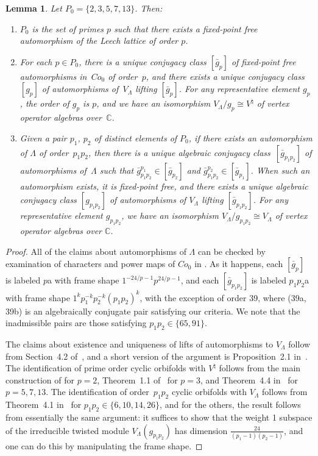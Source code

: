 \documentclass[pdftex]{sigma}
\newcommand{\bC}{\mathbb{C}}
\newtheorem{lem}[thm]{Lemma}
\theoremstyle{definition}
\begin{document}
\begin{lem} \label{lem:cyclic-leech-orbifolds} Let $P_0 = \{ 2,3,5,7,13\}$. Then:
\begin{enumerate}\itemsep=0pt
\item[$1.$] $P_0$ is the set of primes $p$ such that there exists a fixed-point free automorphism of the Leech lattice of order $p$.
\item[$2.$] For each $p \in P_0$, there is a unique conjugacy class $[\bar{g}_p]$ of fixed-point free automorphisms in~$Co_0$ of order~$p$, and there exists a unique conjugacy class $[g_p]$ of automorphisms of~$V_\Lambda$ lifting $[\bar{g}_p]$. For any representative element $g_p$, the order of $g_p$ is $p$, and we have an isomorphism $V_\Lambda/g_p \cong V^\natural$ of vertex operator algebras over~$\bC$.
\item[$3.$] Given a pair $p_1$, $p_2$ of distinct elements of $P_0$, if there exists an automorphism of $\Lambda$ of order~$p_1p_2$, then there is a unique algebraic conjugacy class~$[\bar{g}_{p_1p_2}]$ of automorphisms of~$\Lambda$ such that $\bar{g}_{p_1p_2}^{p_1} \in [\bar{g}_{p_2}]$ and $\bar{g}_{p_1p_2}^{p_2} \in [\bar{g}_{p_1}]$. When such an automorphism exists, it is fixed-point free, and there exists a unique algebraic conjugacy class $[g_{p_1p_2}]$ of automorphisms of $V_\Lambda$ lifting $[\bar{g}_{p_1p_2}]$. For any representative element $g_{p_1p_2}$, we have an isomorphism $V_\Lambda/g_{p_1p_2} \cong V_\Lambda$ of vertex operator algebras over $\bC$.
\end{enumerate}
\end{lem}
\begin{proof}All of the claims about automorphisms of $\Lambda$ can be checked by examination of characters and power maps of $Co_0$ in \cite{GAP}. As it happens, each $[\bar{g}_p]$ is labeled $p$a with frame shape $1^{-24/p-1}p^{24/p-1}$, and each $[\bar{g}_{p_1p_2}]$ is labeled $p_1p_2$a with frame shape $1^kp_1^{-k}p_2^{-k}(p_1p_2)^k$, with the exception of order 39, where (39a, 39b) is an algebraically conjugate pair satisfying our criteria. We note that the inadmissible pairs are those satisfying $p_1p_2 \in \{ 65, 91\}$.

The claims about existence and uniqueness of lifts of automorphisms to $V_\Lambda$ follow from Section~4.2 of~\cite{LS17}, and a short version of the argument is Proposition~2.1 in~\cite{C17}. The identification of prime order cyclic orbifolds with $V^\natural$ follows from the main construction of \cite{FLM88} for $p=2$, Theorem~1.1 of~\cite{CLS16} for $p=3$, and Theorem~4.4 in~\cite{ALY17} for $p=5,7,13$. The identification of order~$p_1p_2$ cyclic orbifolds with $V_\Lambda$ follows from Theorem~4.1 in~\cite{ALY17} for $p_1p_2 \in \{6,10,14,26 \}$, and for the others, the result follows from essentially the same argument: it suffices to show that the weight 1 subspace of the irreducible twisted module $V_\Lambda(g_{p_1p_2})$ has dimension $\frac{24}{(p_1-1)(p_2-1)}$, and one can do this by manipulating the frame shape.
\end{proof}
\end{document}
